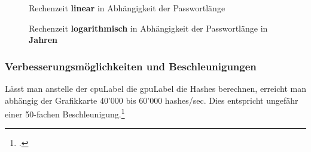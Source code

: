 \begin{figure}[H]
	\begin{minipage}[b]{.45\linewidth}
	   	\pgfplotsset{width=1.0\textwidth, height=0.7\textwidth}
		\centering
		\label{fig:1a}
	\end{minipage}%
	\begin{minipage}[b]{.45\linewidth}
		\pgfplotsset{width=1.0\textwidth, height=0.7\textwidth}
		\centering
		\label{fig:1b}
	\end{minipage}
	\caption{Rechenzeit \textbf{linear} in Abhängigkeit der Passwortlänge}\label{fig:1}
	\label{fig:wpa_attack_linear}
\end{figure}

\begin{figure}[H]
	\begin{minipage}[b]{.65\linewidth}
		\pgfplotsset{width=1.0\textwidth, height=0.7\textwidth}
		\centering
	\end{minipage}
	\caption{Rechenzeit \textbf{logarithmisch} in Abhängigkeit der Passwortlänge in \textbf{Jahren}}\label{fig:}
	\label{fig:wpa_attack_log}
\end{figure}


\subsubsection{Verbesserungsmöglichkeiten und Beschleunigungen}
Lässt man anstelle der \gls{cpuLabel} die \gls{gpuLabel} die Hashes berechnen, erreicht man abhängig der Grafikkarte 40'000 bis 60'000 hashes/sec. Dies entspricht ungefähr einer 50-fachen Beschleunigung.\footcite[][158]{WrightCache201503}

